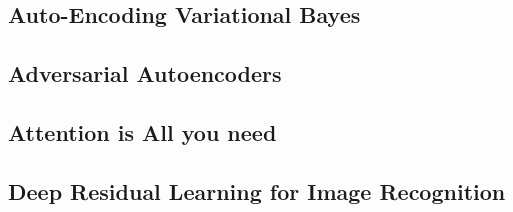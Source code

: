 \subsection{Auto-Encoding Variational Bayes}


\subsection{Adversarial Autoencoders}


\subsection{Attention is All you need}


\subsection{Deep Residual Learning for Image Recognition}
